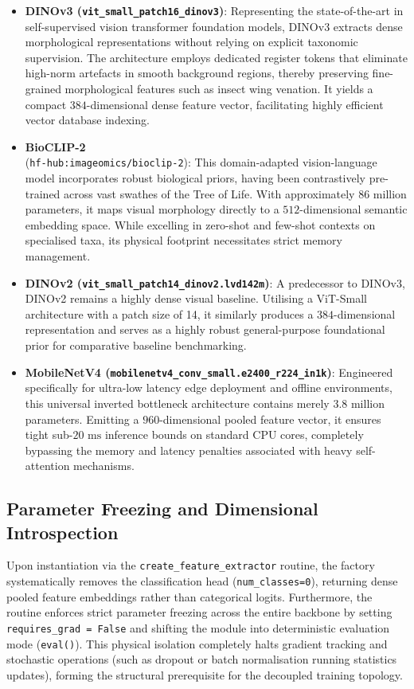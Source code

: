 \begin{itemize}
    \item \textbf{DINOv3 (\texttt{vit\_small\_patch16\_dinov3})}: Representing the state-of-the-art in self-supervised vision transformer foundation models, DINOv3 extracts dense morphological representations without relying on explicit taxonomic supervision. The architecture employs dedicated register tokens that eliminate high-norm artefacts in smooth background regions, thereby preserving fine-grained morphological features such as insect wing venation. It yields a compact $384$-dimensional dense feature vector, facilitating highly efficient vector database indexing.
    \item \textbf{BioCLIP-2}\\(\texttt{hf-hub:imageomics/bioclip-2}): This domain-adapted vision-language model incorporates robust biological priors, having been contrastively pre-trained across vast swathes of the Tree of Life. With approximately 86 million parameters, it maps visual morphology directly to a $512$-dimensional semantic embedding space. While excelling in zero-shot and few-shot contexts on specialised taxa, its physical footprint necessitates strict memory management.
    \item \textbf{DINOv2 (\texttt{vit\_small\_patch14\_dinov2.lvd142m})}: A predecessor to DINOv3, DINOv2 remains a highly dense visual baseline. Utilising a ViT-Small architecture with a patch size of 14, it similarly produces a $384$-dimensional representation and serves as a highly robust general-purpose foundational prior for comparative baseline benchmarking.
    \item \textbf{MobileNetV4 (\texttt{mobilenetv4\_conv\_small.e2400\_r224\_in1k})}: Engineered specifically for ultra-low latency edge deployment and offline environments, this universal inverted bottleneck architecture contains merely 3.8 million parameters. Emitting a $960$-dimensional pooled feature vector, it ensures tight sub-$20\text{ ms}$ inference bounds on standard CPU cores, completely bypassing the memory and latency penalties associated with heavy self-attention mechanisms.
\end{itemize}

\subsection{Parameter Freezing and Dimensional Introspection}

Upon instantiation via the \texttt{create\_feature\_extractor} routine, the factory systematically removes the classification head (\texttt{num\_classes=0}), returning dense pooled feature embeddings rather than categorical logits. Furthermore, the routine enforces strict parameter freezing across the entire backbone by setting \texttt{requires\_grad = False} and shifting the module into deterministic evaluation mode (\texttt{eval()}). This physical isolation completely halts gradient tracking and stochastic operations (such as dropout or batch normalisation running statistics updates), forming the structural prerequisite for the decoupled training topology.

